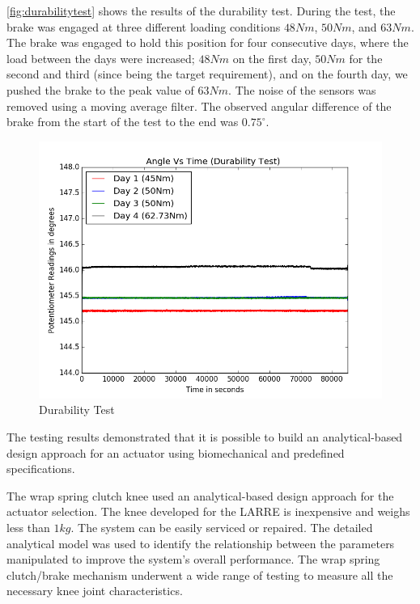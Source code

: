 \autoref{fig:durabilitytest} shows the results of the durability test. During the test, the brake was engaged at three different loading conditions $48Nm$, $50Nm$, and $63Nm$. The brake was engaged to hold this position for four consecutive days, where the load between the days were increased; $48Nm$ on the first day, $50Nm$ for the second and third (since being the target requirement), and on the fourth day, we pushed the brake to the peak value of $63Nm$. The noise of the sensors was removed using a moving average filter.  The observed angular difference of the brake from the start of the test to the end was $0.75^{\circ}$.

\begin{figure}[h!]
    \centering
    \includegraphics[scale=0.50]{images/mech_design/Durability_test.png}
    \caption{Durability Test}
    \label{fig:durabilitytest}
\end{figure}


The testing results demonstrated that it is possible to build an analytical-based design approach for an actuator using biomechanical and predefined specifications.


The wrap spring clutch knee used an analytical-based design approach for the actuator selection. The knee developed for the LARRE is inexpensive and weighs less than  $1kg$. The system can be easily serviced or repaired. The detailed analytical model was used to identify the relationship between the parameters manipulated to improve the system's overall performance. The wrap spring clutch/brake mechanism underwent a wide range of testing to measure all the necessary knee joint characteristics. 


